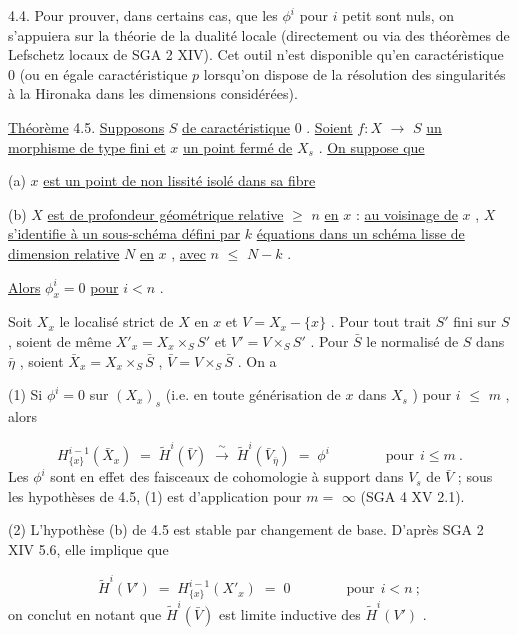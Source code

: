 4.4.  Pour prouver, dans certains cas, que les  $\phi^i$  pour  $i$  petit sont nuls, on s'appuiera sur la théorie de la dualité locale (directement ou via des théorèmes de Lefschetz locaux de SGA 2 XIV). Cet outil n'est disponible qu'en caractéristique 0 (ou en égale caractéristique  $p$ lorsqu'on dispose de la résolution des singularités à la Hironaka dans les dimensions considérées).



\underline{Théorème} 4.5.  \underline{Supposons}  $S$  \underline{de caractéristique} 0 . \underline{Soient}  $f : X$ $\longrightarrow$ $S$  \underline{un morphisme de type fini et}  $x$  \underline{un point fermé de}  $X_s$ . \underline{On suppose que}

(a) $x$  \underline{est un point de non lissité isolé dans sa fibre}

(b) $X$  \underline{est de profondeur géométrique relative} $\geqslant$ $n$ \underline{en}  $x$ : \underline{au voisinage de} $x$ , $X$ \underline{s'identifie à un sous-schéma défini par} $k$ \underline{équations dans un schéma lisse de dimension relative} $N$ \underline{en} $x$ , \underline{avec}  $n$ $\leqslant$ $N-k$ .

\underline{Alors}  $\phi^i_x = 0$  \underline{pour}  $i < n$ .

Soit  $X_x$  le localisé strict de  $X$  en  $x$  et  $V = X_x - \{x\}$  . Pour tout trait  $S'$  fini sur  $S$ , soient de même  $X'_x = X_x \times_S S'$  et  $V' = V \times_S S'$ . Pour  $\bar{S}$  le normalisé de  $S$  dans  $\bar{\eta}$ , soient  $\bar{X}_x = X_x \times_S \bar{S}$ ,  $\bar{V} = V \times_S \bar{S}$ . On a

(1) Si $\phi^i = 0$  sur  $(X_x)_s$  (i.e. en toute générisation de  $x$  dans  $X_s$ ) pour $i$ $\leqslant$ $m$ , alors

\begin{equation*}
H^{i-1}_{\{x\}}(\bar{X}_x) \;=\; \widetilde{H}^{i}(\bar{V}) \;\xrightarrow{\ \sim\ }\; \widetilde{H}^{i}(\bar{V}_{\bar{\eta}}) \;=\; \phi^i \qquad\qquad \text{pour}\ \ i \leqslant m\ .
\end{equation*}
Les  $\phi^i$  sont en effet des faisceaux de cohomologie à support dans  $V_s$  de  $\bar{V}$ ; sous les hypothèses de 4.5, (1) est d'application pour  $m =$ $\infty$   (SGA 4 XV 2.1).

(2) L'hypothèse (b) de 4.5 est stable par changement de base. D'après SGA 2 XIV 5.6, elle implique que

\begin{equation*}
\widetilde{H}^{i}(V') \;=\; H^{i-1}_{\{x\}}(X'_x) \;=\; 0 \qquad\qquad \text{pour}\ \ i < n\ ;
\end{equation*}
on conclut en notant que  $\widetilde{H}^{i}(\bar{V})$  est limite inductive des  $\widetilde{H}^{i}(V')$  .

